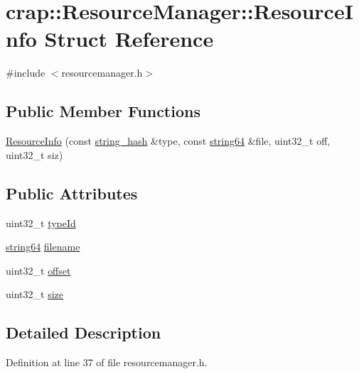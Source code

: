 \hypertarget{structcrap_1_1_resource_manager_1_1_resource_info}{}\section{crap\+:\+:Resource\+Manager\+:\+:Resource\+Info Struct Reference}
\label{structcrap_1_1_resource_manager_1_1_resource_info}


{\ttfamily \#include $<$resourcemanager.\+h$>$}

\subsection*{Public Member Functions}
\begin{DoxyCompactItemize}
\item 
\hyperlink{structcrap_1_1_resource_manager_1_1_resource_info_afb50b0f094457196b8579eeb906315cf}{Resource\+Info} (const \hyperlink{classcrap_1_1string__hash}{string\+\_\+hash} \&type, const \hyperlink{namespacecrap_a2b8a7358804e1a9c3c32f12d8cdcfdf8}{string64} \&file, uint32\+\_\+t off, uint32\+\_\+t siz)
\end{DoxyCompactItemize}
\subsection*{Public Attributes}
\begin{DoxyCompactItemize}
\item 
uint32\+\_\+t \hyperlink{structcrap_1_1_resource_manager_1_1_resource_info_a25ed728173b3bf40cd2d4d38a66a0abe}{type\+Id}
\item 
\hyperlink{namespacecrap_a2b8a7358804e1a9c3c32f12d8cdcfdf8}{string64} \hyperlink{structcrap_1_1_resource_manager_1_1_resource_info_a8cffa7bd1d3f21ad08eeafbe0159217b}{filename}
\item 
uint32\+\_\+t \hyperlink{structcrap_1_1_resource_manager_1_1_resource_info_ad2c655eaf108741d772e0905dc0daa6b}{offset}
\item 
uint32\+\_\+t \hyperlink{structcrap_1_1_resource_manager_1_1_resource_info_a6f6d3295854ec9c59bb39ad39764c7d8}{size}
\end{DoxyCompactItemize}


\subsection{Detailed Description}


Definition at line 37 of file resourcemanager.\+h.



